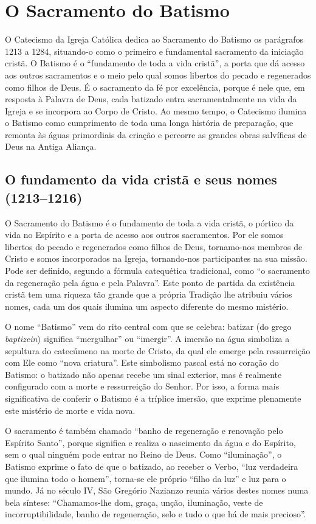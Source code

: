 \chapter{O Sacramento do Batismo}

O Catecismo da Igreja Católica dedica ao Sacramento do Batismo os parágrafos 1213 a 1284, situando-o como o primeiro e fundamental sacramento da iniciação cristã. O Batismo é o ``fundamento de toda a vida cristã'', a porta que dá acesso aos outros sacramentos e o meio pelo qual somos libertos do pecado e regenerados como filhos de Deus. É o sacramento da fé por excelência, porque é nele que, em resposta à Palavra de Deus, cada batizado entra sacramentalmente na vida da Igreja e se incorpora ao Corpo de Cristo. Ao mesmo tempo, o Catecismo ilumina o Batismo como cumprimento de toda uma longa história de preparação, que remonta às águas primordiais da criação e percorre as grandes obras salvíficas de Deus na Antiga Aliança.

\section{O fundamento da vida cristã e seus nomes (1213--1216)}

O Sacramento do Batismo é o fundamento de toda a vida cristã, o pórtico da vida no Espírito e a porta de acesso aos outros sacramentos. Por ele somos libertos do pecado e regenerados como filhos de Deus, tornamo-nos membros de Cristo e somos incorporados na Igreja, tornando-nos participantes na sua missão. Pode ser definido, segundo a fórmula catequética tradicional, como ``o sacramento da regeneração pela água e pela Palavra''. Este ponto de partida da existência cristã tem uma riqueza tão grande que a própria Tradição lhe atribuiu vários nomes, cada um dos quais ilumina um aspecto diferente do mesmo mistério.

O nome ``Batismo'' vem do rito central com que se celebra: batizar (do grego \emph{baptizein}) significa ``mergulhar'' ou ``imergir''. A imersão na água simboliza a sepultura do catecúmeno na morte de Cristo, da qual ele emerge pela ressurreição com Ele como ``nova criatura''. Este simbolismo pascal está no coração do Batismo: o batizado não apenas recebe um sinal exterior, mas é realmente configurado com a morte e ressurreição do Senhor. Por isso, a forma mais significativa de conferir o Batismo é a tríplice imersão, que exprime plenamente este mistério de morte e vida nova.

O sacramento é também chamado ``banho de regeneração e renovação pelo Espírito Santo'', porque significa e realiza o nascimento da água e do Espírito, sem o qual ninguém pode entrar no Reino de Deus. Como ``iluminação'', o Batismo exprime o fato de que o batizado, ao receber o Verbo, ``luz verdadeira que ilumina todo o homem'', torna-se ele próprio ``filho da luz'' e luz para o mundo. Já no século IV, São Gregório Nazianzo reunia vários destes nomes numa bela síntese: ``Chamamos-lhe dom, graça, unção, iluminação, veste de incorruptibilidade, banho de regeneração, selo e tudo o que há de mais precioso''.


